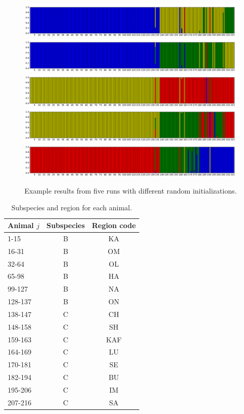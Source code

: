 \documentclass[12pt]{article}
\begin{document}
\begin{figure}
\begin{center}
\includegraphics[width=1\textwidth]{figures/results1.png}
\includegraphics[width=1\textwidth]{figures/results2.png}
\includegraphics[width=1\textwidth]{figures/results3.png}
\includegraphics[width=1\textwidth]{figures/results4.png}
\includegraphics[width=1\textwidth]{figures/results5.png}
\end{center}
\caption{Example results from five runs with different random initializations.}
\label{figure:results}
\end{figure}


\begin{table}
\centering
\caption{Subspecies and region for each animal.}%
\label{table:sources}%
\begin{tabular}{|l|c|c|}
\hline
Animal $j$ & Subspecies & Region code \\
\hline
1-15 & B & KA \\
16-31 & B & OM \\
32-64 & B & OL \\
65-98 & B & HA \\
99-127 & B & NA \\
128-137 & B & ON \\
138-147 & C & CH\\
148-158 & C & SH\\
159-163 & C & KAF\\
164-169 & C & LU\\
170-181 & C & SE\\
182-194 & C & BU\\
195-206 & C & IM\\
207-216 & C & SA\\
\hline
\end{tabular}
\end{table}
\end{document}
